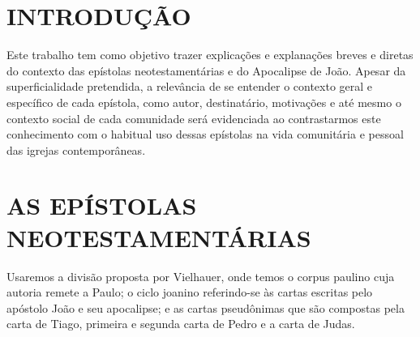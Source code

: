 \documentclass[
    article,            %
	12pt,				%
	oneside,			%
	a4paper,			%
	chapter=TITLE,		%
	section=TITLE,		%
	english,			%
	french,				%
	spanish,			%
	brazil				%
	]{abntex2}
\begin{document}



\imprimircapa

\imprimirfolhaderosto

\tableofcontents*
\cleardoublepage

\textual
\pagestyle{simple}


\section{INTRODUÇÃO}
Este trabalho tem como objetivo trazer explicações e explanações breves e diretas do contexto das epístolas neotestamentárias e do Apocalipse de João. Apesar da superficialidade pretendida, a relevância de se entender o contexto geral e específico de cada epístola, como autor, destinatário, motivações e até mesmo o contexto social de cada comunidade será evidenciada ao contrastarmos este conhecimento com o habitual uso dessas epístolas na vida comunitária e pessoal das igrejas contemporâneas.

\section{AS EPÍSTOLAS NEOTESTAMENTÁRIAS}
Usaremos a divisão proposta por Vielhauer, onde temos o corpus paulino cuja autoria remete a Paulo; o ciclo joanino referindo-se às cartas escritas pelo apóstolo João e seu apocalipse; e as cartas pseudônimas que são compostas pela carta de Tiago, primeira e segunda carta de Pedro e a carta de Judas.
\end{document}
